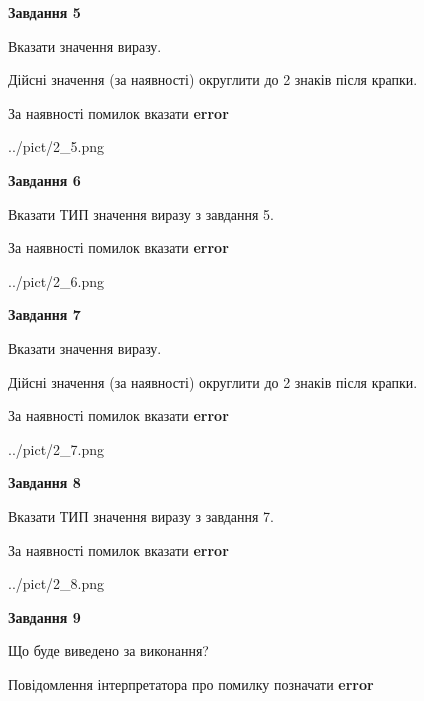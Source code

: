 \documentclass[11pt, ukrainian]{article}
\begin{document}
{\begin {large}
{\begin {center}\textbf{Завдання 5}\end {center}}\par
Вказати значення виразу. \par
Дійсні значення (за наявності) округлити до 2 знаків після крапки. \par
За наявності помилок вказати \textbf{error}

\begin{center}
	{../pict/2_5.png}
\end{center}
\newpage

{\begin {center}\textbf{Завдання 6}\end {center}}\par
Вказати ТИП значення виразу з завдання 5. \par
За наявності помилок вказати \textbf{error}

\begin{center}
	{../pict/2_6.png}
\end{center}
\newpage

{\begin {center}\textbf{Завдання 7}\end {center}}\par
Вказати значення виразу. \par
Дійсні значення (за наявності) округлити до 2 знаків після крапки. \par
За наявності помилок вказати \textbf{error}

\begin{center}
	{../pict/2_7.png}
\end{center}
\newpage

{\begin {center}\textbf{Завдання 8}\end {center}}\par
Вказати ТИП значення виразу з завдання 7. \par
За наявності помилок вказати \textbf{error}

\begin{center}
	{../pict/2_8.png}
\end{center}
\newpage

{\begin {center}\textbf{Завдання 9}\end {center}}\par
Що буде виведено за виконання? \par
Повідомлення інтерпретатора про помилку позначати \textbf{error}


\end{large}}
\end{document}
